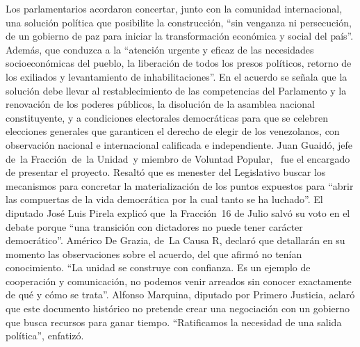 \documentclass{article}%
\begin{document}
\newline%
%
Los parlamentarios acordaron concertar, junto con la comunidad internacional, una solución política que posibilite la construcción, “sin venganza ni persecución, de un gobierno de paz para iniciar la transformación económica y social del país”. Además, que conduzca a la “atención urgente y eficaz de las necesidades socioeconómicas del pueblo, la liberación de todos los presos políticos, retorno de los exiliados y levantamiento de inhabilitaciones”.%
\newline%
%
En el acuerdo se señala que la solución debe llevar al restablecimiento de las competencias del Parlamento y la renovación de los poderes públicos, la disolución de la asamblea nacional constituyente, y a condiciones electorales democráticas para que se celebren elecciones generales que garanticen el derecho de elegir de los venezolanos, con observación nacional e internacional calificada e independiente.%
\newline%
%
Juan Guaidó, jefe de~la Fracción~de~la Unidad~y miembro de Voluntad Popular, ~fue el encargado de presentar el proyecto. Resaltó que es menester del Legislativo buscar los mecanismos para concretar la materialización de los puntos expuestos para “abrir las compuertas de la vida democrática por la cual tanto se ha luchado”.%
\newline%
%
El diputado José Luis Pirela explicó que~la Fracción~16 de Julio salvó su voto en el debate porque “una transición con dictadores no puede tener carácter democrático”.%
\newline%
%
Américo De Grazia, de~La Causa R, declaró que detallarán en su momento las observaciones sobre el acuerdo, del que afirmó no tenían conocimiento. “La unidad se construye con confianza. Es un ejemplo de cooperación y comunicación, no podemos venir arreados sin conocer exactamente de qué y cómo se trata”.%
\newline%
%
Alfonso Marquina, diputado por Primero Justicia, aclaró que este documento histórico no pretende crear una negociación con un gobierno que busca recursos para ganar tiempo. “Ratificamos la necesidad de una salida política”, enfatizó.%
\newline%
%
\end{document}
